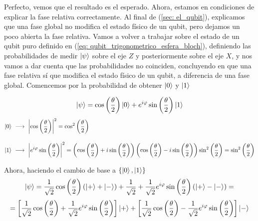 \documentclass{article}
\numberwithin{equation}{section} %
\begin{document}
    Perfecto, vemos que el resultado es el esperado. Ahora, estamos en condiciones de explicar la fase relativa correctamente. Al final de (\ref{sec: el_qubit}), explicamos que una fase global no modifica el estado físico de un qubit, pero dejamos un poco abierta la fase relativa. Vamos a volver a trabajar sobre el estado de un qubit puro definido en (\ref{eq: qubit_trigonometrico_esfera_bloch}), definiendo las probabilidades de medir \( \ket{\psi} \) sobre el eje \( Z \) y posteriormente sobre el eje \( X \), y nos vamos a dar cuenta que las probabilidades no coinciden, concluyendo en que una fase relativa sí que modifica el estado físico de un qubit, a diferencia de una fase global. Comencemos por la probabilidad de obtener \( \ket{0} \) y \( \ket{1} \)

    \begin{equation*}
        \ket{\psi} = \cos \left( \frac{\theta}{2} \right) \ket{0} + e^{i \varphi} \sin \left( \frac{\theta}{2} \right) \ket{1}
    \end{equation*}
    \begin{align*}
        \ket{0} \ &\longrightarrow \ \left| \cos \left( \frac{\theta}{2} \right) \right| ^ {2} = \cos^{2} \left( \frac{\theta}{2} \right) \\[10pt]
        \ket{1} \ &\longrightarrow \ \left| e^{i \varphi} \sin \left( \frac{\theta}{2} \right) \right| ^ {2} = \left( \cos \left( \frac{\theta}{2} \right) + i \sin \left( \frac{\theta}{2} \right) \right) \left( \cos \left( \frac{\theta}{2} \right) - i \sin \left( \frac{\theta}{2} \right) \right) \sin^{2} \left( \frac{\theta}{2} \right) = \sin^{2} \left( \frac{\theta}{2} \right)
    \end{align*}

    \vspace{2.5mm}

    Ahora, haciendo el cambio de base a \( \left\{ \ket{0}, \ket{1} \right\} \)
    \begin{equation*}
        \ket{\psi} = \frac{1}{\sqrt{2}} \cos \left( \frac{\theta}{2} \right) \left( \ket{+} + \ket{-} \right) + \frac{1}{\sqrt{2}} + \frac{1}{\sqrt{2}} e^{i \varphi} \sin \left( \frac{\theta}{2} \right) \left( \ket{+} - \ket{-} \right) = 
    \end{equation*}
    \begin{equation*}
        = \left[ \frac{1}{\sqrt{2}} \cos \left( \frac{\theta}{2} \right) + \frac{1}{\sqrt{2}} e^{i \varphi} \sin \left( \frac{\theta}{2} \right) \right] \ket{+} + \left[ \frac{1}{\sqrt{2}} \cos \left( \frac{\theta}{2} \right) - \frac{1}{\sqrt{2}} e^{i \varphi} \sin \left( \frac{\theta}{2} \right) \right] \ket{-} 
    \end{equation*}
\end{document}
